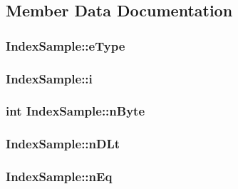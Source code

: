 \subsection{Member Data Documentation}
\hypertarget{struct_index_sample_a369f346d71bab2423e015d0fb6809290}{
\subsubsection[{e\-Type}]{ Index\-Sample\-::e\-Type}}\label{struct_index_sample_a369f346d71bab2423e015d0fb6809290}
\hypertarget{struct_index_sample_ab59c5fa6b8a13ee55cb2b7d344438cb3}{
\subsubsection[{i}]{ Index\-Sample\-::i}}\label{struct_index_sample_ab59c5fa6b8a13ee55cb2b7d344438cb3}
\hypertarget{struct_index_sample_a216647c71443cdd198787afc6e1a3951}{
\subsubsection[{n\-Byte}]{\setlength{\rightskip}{0pt plus 5cm}int Index\-Sample\-::n\-Byte}}\label{struct_index_sample_a216647c71443cdd198787afc6e1a3951}
\hypertarget{struct_index_sample_ab24fbf5f95e260735c63c8b7986126ca}{
\subsubsection[{n\-D\-Lt}]{ Index\-Sample\-::n\-D\-Lt}}\label{struct_index_sample_ab24fbf5f95e260735c63c8b7986126ca}
\hypertarget{struct_index_sample_aca6a7f1338b7a316ec29e8968568c3d1}{
\subsubsection[{n\-Eq}]{ Index\-Sample\-::n\-Eq}}\label{struct_index_sample_aca6a7f1338b7a316ec29e8968568c3d1}
